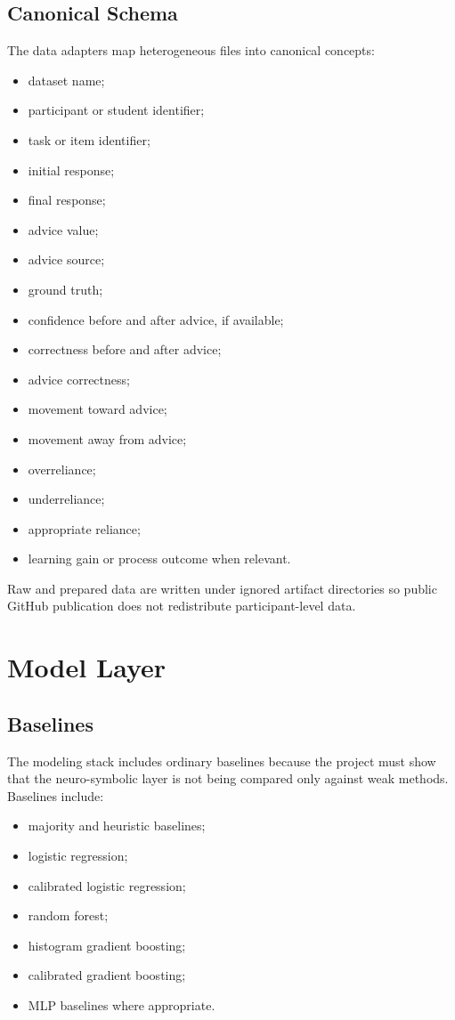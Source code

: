 \documentclass[11pt]{article}
\begin{document}
\subsection{Canonical Schema}

The data adapters map heterogeneous files into canonical concepts:

\begin{itemize}[leftmargin=*]
  \item dataset name;
  \item participant or student identifier;
  \item task or item identifier;
  \item initial response;
  \item final response;
  \item advice value;
  \item advice source;
  \item ground truth;
  \item confidence before and after advice, if available;
  \item correctness before and after advice;
  \item advice correctness;
  \item movement toward advice;
  \item movement away from advice;
  \item overreliance;
  \item underreliance;
  \item appropriate reliance;
  \item learning gain or process outcome when relevant.
\end{itemize}

Raw and prepared data are written under ignored artifact directories so public GitHub publication does not redistribute participant-level data.

\section{Model Layer}

\subsection{Baselines}

The modeling stack includes ordinary baselines because the project must show that the neuro-symbolic layer is not being compared only against weak methods. Baselines include:

\begin{itemize}[leftmargin=*]
  \item majority and heuristic baselines;
  \item logistic regression;
  \item calibrated logistic regression;
  \item random forest;
  \item histogram gradient boosting;
  \item calibrated gradient boosting;
  \item MLP baselines where appropriate.
\end{itemize}
\end{document}
